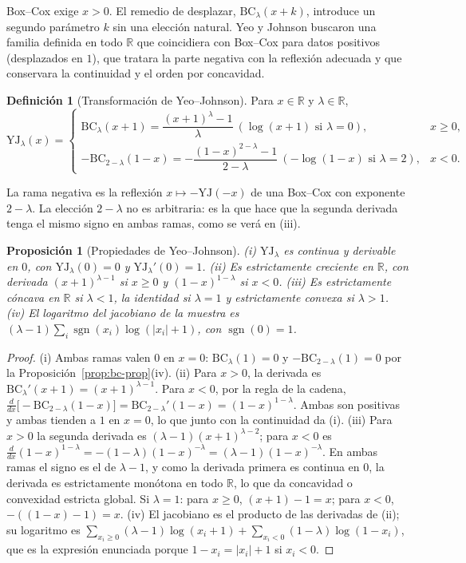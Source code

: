 \documentclass[11pt]{article}
\newtheorem{proposicion}[teorema]{Proposición}
\theoremstyle{definition}
\newtheorem{definicion}[teorema]{Definición}
\theoremstyle{remark}
\newcommand{\R}{\mathbb{R}}
\DeclareMathOperator{\sgn}{sgn}
\newcommand{\BC}{\mathrm{BC}}
\newcommand{\YJ}{\mathrm{YJ}}
\newcommand{\abs}[1]{\left\lvert #1\right\rvert}
\begin{document}
\noindent Box--Cox exige $x>0$. El remedio de desplazar, $\BC_\lambda(x+k)$, introduce un segundo parámetro $k$ sin una elección natural. Yeo y Johnson buscaron una familia definida en todo $\R$ que coincidiera con Box--Cox para datos positivos (desplazados en $1$), que tratara la parte negativa con la reflexión adecuada y que conservara la continuidad y el orden por concavidad.

\begin{definicion}[Transformación de Yeo--Johnson]\label{def:yj}
\noindent Para $x\in\R$ y $\lambda\in\R$,
\[
\YJ_\lambda(x)=\begin{cases}\BC_\lambda(x+1)=\dfrac{(x+1)^\lambda-1}{\lambda}\ (\log(x+1)\text{ si }\lambda=0),&x\ge0,\\[3mm]
-\BC_{2-\lambda}(1-x)=-\dfrac{(1-x)^{2-\lambda}-1}{2-\lambda}\ (-\log(1-x)\text{ si }\lambda=2),&x<0.\end{cases}
\]
\end{definicion}

\noindent La rama negativa es la reflexión $x\mapsto-\YJ(-x)$ de una Box--Cox con exponente $2-\lambda$. La elección $2-\lambda$ no es arbitraria: es la que hace que la segunda derivada tenga el mismo signo en ambas ramas, como se verá en (iii).

\begin{proposicion}[Propiedades de Yeo--Johnson]\label{prop:yj}
\noindent (i) $\YJ_\lambda$ es continua y derivable en $0$, con $\YJ_\lambda(0)=0$ y $\YJ_\lambda'(0)=1$. (ii) Es estrictamente creciente en $\R$, con derivada $(x+1)^{\lambda-1}$ si $x\ge0$ y $(1-x)^{1-\lambda}$ si $x<0$. (iii) Es estrictamente cóncava en $\R$ si $\lambda<1$, la identidad si $\lambda=1$ y estrictamente convexa si $\lambda>1$. (iv) El logaritmo del jacobiano de la muestra es $(\lambda-1)\sum_i\sgn(x_i)\log(\abs{x_i}+1)$, con $\sgn(0)=1$.
\end{proposicion}
\begin{proof}
\noindent (i) Ambas ramas valen $0$ en $x=0$: $\BC_\lambda(1)=0$ y $-\BC_{2-\lambda}(1)=0$ por la Proposición~\ref{prop:bc-prop}(iv). (ii) Para $x>0$, la derivada es $\BC_\lambda'(x+1)=(x+1)^{\lambda-1}$. Para $x<0$, por la regla de la cadena, $\frac{d}{dx}\big[-\BC_{2-\lambda}(1-x)\big]=\BC_{2-\lambda}'(1-x)=(1-x)^{1-\lambda}$. Ambas son positivas y ambas tienden a $1$ en $x=0$, lo que junto con la continuidad da (i). (iii) Para $x>0$ la segunda derivada es $(\lambda-1)(x+1)^{\lambda-2}$; para $x<0$ es $\frac{d}{dx}(1-x)^{1-\lambda}=-(1-\lambda)(1-x)^{-\lambda}=(\lambda-1)(1-x)^{-\lambda}$. En ambas ramas el signo es el de $\lambda-1$, y como la derivada primera es continua en $0$, la derivada es estrictamente monótona en todo $\R$, lo que da concavidad o convexidad estricta global. Si $\lambda=1$: para $x\ge0$, $(x+1)-1=x$; para $x<0$, $-((1-x)-1)=x$. (iv) El jacobiano es el producto de las derivadas de (ii); su logaritmo es $\sum_{x_i\ge0}(\lambda-1)\log(x_i+1)+\sum_{x_i<0}(1-\lambda)\log(1-x_i)$, que es la expresión enunciada porque $1-x_i=\abs{x_i}+1$ si $x_i<0$.
\end{proof}
\end{document}
